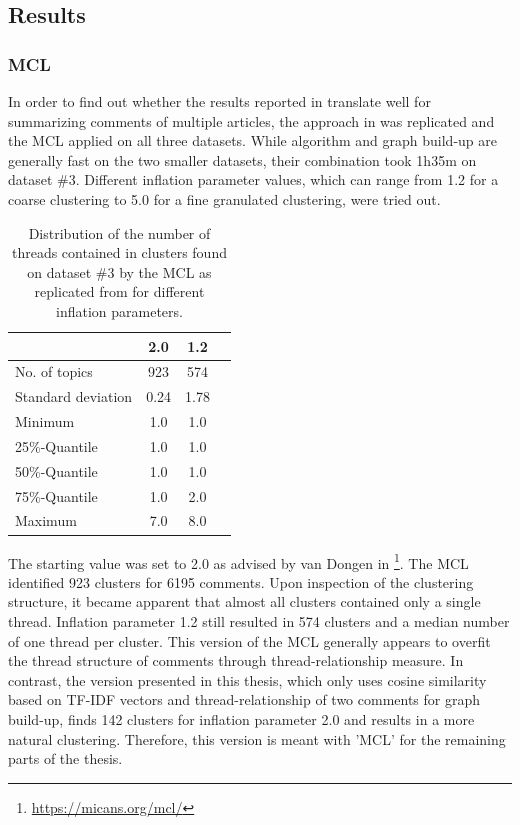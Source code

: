 \subsection{Results}

\subsubsection{MCL}
In order to find out whether the results reported in \cite{DBLP:conf/ecir/AkerKBPBHG16} translate well for summarizing comments of multiple articles, the approach in \cite{DBLP:conf/ecir/AkerKBPBHG16} was replicated and the MCL applied on all three datasets. While algorithm and graph build-up are generally fast on the two smaller datasets, their combination took 1h35m on dataset \#3. Different inflation parameter values, which can range from 1.2 for a coarse clustering to 5.0 for a fine granulated clustering, were tried out.
\begin{table}[H]
\centering
\caption{Distribution of the number of threads contained in clusters found on dataset \#3 by the MCL as replicated from \cite{DBLP:conf/ecir/AkerKBPBHG16} for different inflation parameters.}
\begin{tabular}{||l||c|c|c||}
\hline
 & 2.0 & 1.2 \\
\hline
No. of topics & 923 & 574 \\
Standard deviation & 0.24 & 1.78   \\
Minimum & 1.0 & 1.0 \\
25\%-Quantile & 1.0 & 1.0 \\
50\%-Quantile & 1.0 & 1.0 \\
75\%-Quantile & 1.0 & 2.0 \\
Maximum & 7.0 & 8.0 \\
\hline
\end{tabular}
\end{table}
The starting value was set to 2.0 as advised by van Dongen in \footnote{\url{https://micans.org/mcl/}}. The MCL identified 923 clusters for 6195 comments. Upon inspection of the clustering structure, it became apparent that almost all clusters contained only a single thread. Inflation parameter 1.2 still resulted in 574 clusters and a median number of one thread per cluster. This version of the MCL generally appears to overfit the thread structure of comments through thread-relationship measure. In contrast, the version presented in this thesis, which only uses cosine similarity based on TF-IDF vectors and thread-relationship of two comments for graph build-up, finds 142 clusters for inflation parameter 2.0 and results in a more natural clustering. Therefore, this version is meant with 'MCL' for the remaining parts of the thesis.

